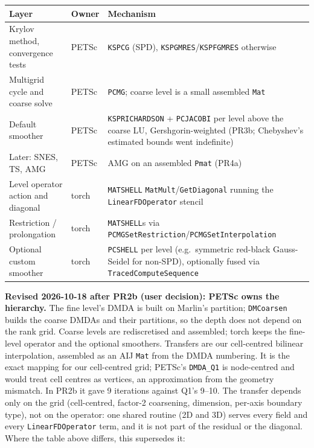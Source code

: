 \documentclass[11pt]{article}
\begin{document}
\begin{longtable}{p{} p{} p{}}
\toprule
Layer & Owner & Mechanism \\
\midrule
\endhead
Krylov method, convergence tests & PETSc & \texttt{KSPCG} (SPD), \texttt{KSPGMRES}/\texttt{KSPFGMRES} otherwise \\
Multigrid cycle and coarse solve & PETSc & \texttt{PCMG}; coarse level is a small assembled \texttt{Mat} \\
Default smoother & PETSc & \texttt{KSPRICHARDSON} + \texttt{PCJACOBI} per level above the coarse LU, Gershgorin-weighted (PR3b; Chebyshev's estimated bounds went indefinite) \\
Later: SNES, TS, AMG & PETSc & AMG on an assembled \texttt{Pmat} (PR4a) \\
Level operator action and diagonal & torch & \texttt{MATSHELL} \texttt{MatMult}/\texttt{GetDiagonal} running the \texttt{LinearFDOperator} stencil \\
Restriction / prolongation & torch & \texttt{MATSHELL}s via \texttt{PCMGSetRestriction}/\texttt{PCMGSetInterpolation} \\
Optional custom smoother & torch & \texttt{PCSHELL} per level (e.g.\ symmetric red-black Gauss-Seidel for non-SPD), optionally fused via \texttt{TracedComputeSequence} \\
\bottomrule
\end{longtable}

\textbf{Revised 2026-10-18 after PR2b (user decision): PETSc owns the
hierarchy.} The fine level's DMDA is built on Marlin's partition;
\texttt{DMCoarsen} builds the coarse DMDAs and their partitions, so the depth
does not depend on the rank grid. Coarse levels are rediscretised and
assembled; torch keeps the fine-level operator and the optional smoothers.
Transfers are our cell-centred bilinear interpolation, assembled as an AIJ
\texttt{Mat} from the DMDA numbering. It is the exact mapping for our
cell-centred grid; PETSc's \texttt{DMDA\_Q1} is node-centred and would treat
cell centres as vertices, an approximation from the geometry mismatch. In
PR2b it gave 9 iterations against Q1's 9--10. The transfer depends only on the
grid (cell-centred, factor-2 coarsening, dimension, per-axis boundary type),
not on the operator: one shared routine (2D and 3D) serves every field and
every \texttt{LinearFDOperator} term, and it is not part of the residual or
the diagonal. Where the table above differs, this supersedes it:
\end{document}
